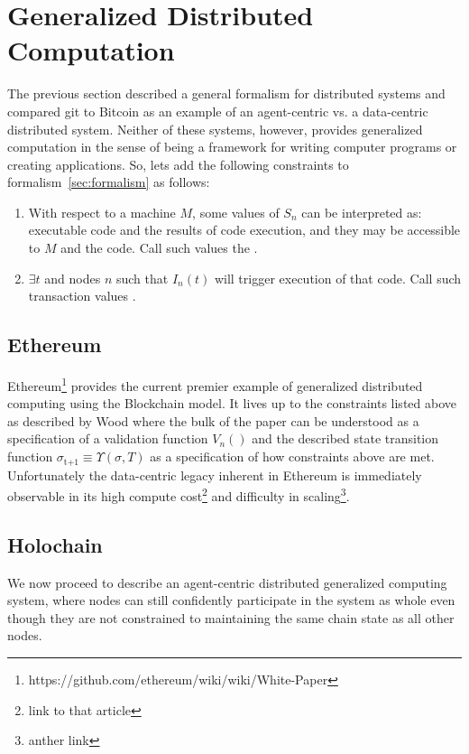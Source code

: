 \documentclass[twocolumn,showpacs,%
  nofootinbib,aps,superscriptaddress,%
  eqsecnum,prd,notitlepage,showkeys,10pt]{revtex4-1}
\begin{document}
\section{Generalized Distributed Computation}
\label{sec:dist-comp}

The previous section described a general formalism for distributed systems and compared git to Bitcoin as an example of an agent-centric vs. a data-centric distributed system.  Neither of these systems, however, provides generalized computation in the sense of being a framework for writing computer programs or creating applications. So, lets add the following constraints to formalism~\ref{sec:formalism} as follows:

\begin{enumerate}
\item With respect to a machine $M$, some values of $S_n$ can be interpreted as: executable code and the results of code execution, and they may be accessible to $M$ and the code.  Call such values the .
\item $\exists t$ and nodes $n$ such that $I_n(t)$ will trigger execution of that code. Call such transaction values .
\end{enumerate}

\subsection{Ethereum}
Ethereum\footnote{https://github.com/ethereum/wiki/wiki/White-Paper} provides the current premier example of generalized distributed computing using the Blockchain model. It lives up to the constraints listed above as described by Wood \cite{yellowpaper} where the bulk of the paper can be understood as a specification of a validation function $V_n()$ and the described state transition function $\sigma_\text{t+1} \equiv \Upsilon(\sigma,T)$ as a specification of how constraints above are met. Unfortunately the data-centric legacy inherent in Ethereum is immediately observable in its  high compute cost\footnote{link to that article} and difficulty in scaling\footnote{anther link}.


\subsection{Holochain}
\label{holochain}
We now proceed to describe an agent-centric distributed generalized computing system, where nodes can still confidently participate in the system as whole even though they are not constrained to maintaining the same chain state as all other nodes.
\end{document}
